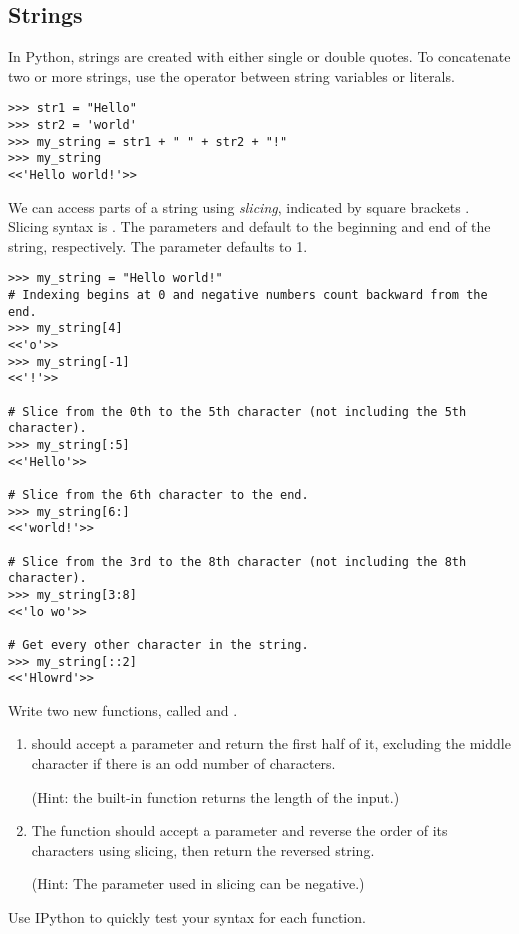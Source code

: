 \subsection*{Strings}
In Python, strings are created with either single or double quotes.
To concatenate two or more strings, use the \li{+} operator between string variables or literals.
\begin{lstlisting}
>>> str1 = "Hello"
>>> str2 = 'world'
>>> my_string = str1 + " " + str2 + "!"
>>> my_string
<<'Hello world!'>>
\end{lstlisting}

We can access parts of a string using \emph{slicing}, indicated by square brackets \li{[ ]}.
Slicing syntax is .
The parameters  and  default to the beginning and end of the string, respectively.
The parameter  defaults to 1.

\begin{lstlisting}
>>> my_string = "Hello world!"
# Indexing begins at 0 and negative numbers count backward from the end.
>>> my_string[4]
<<'o'>>
>>> my_string[-1]
<<'!'>>

# Slice from the 0th to the 5th character (not including the 5th character).
>>> my_string[:5]
<<'Hello'>>

# Slice from the 6th character to the end.
>>> my_string[6:]
<<'world!'>>

# Slice from the 3rd to the 8th character (not including the 8th character).
>>> my_string[3:8]
<<'lo wo'>>

# Get every other character in the string.
>>> my_string[::2]
<<'Hlowrd'>>
\end{lstlisting}

\begin{problem}
Write two new functions, called  and .
\begin{enumerate}
\item {} should accept a parameter and return the first half of it, excluding the middle character if there is an odd number of characters.

(Hint: the built-in function  returns the length of the input.)
\item The  function should accept a parameter and reverse the order of its characters using slicing, then return the reversed string.

(Hint: The  parameter used in slicing can be negative.)
\end{enumerate}
Use IPython to quickly test your syntax for each function.
\end{problem}

